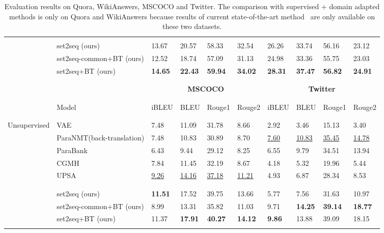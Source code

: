 \begin{table*}[ht]
\begin{tabular}{p{2cm}p{3.4cm}p{0.8cm}<{\centering}p{0.8cm}<{\centering}p{0.8cm}<{\centering}p{0.8cm}<{\centering}p{0.8cm}<{\centering}p{0.8cm}<{\centering}p{0.8cm}<{\centering}p{0.8cm}<{\centering}}
\\ [-1.8ex]
\cline{2-10}
\\ [-1.8ex]
& set2seq \scriptsize{(ours)} & 
13.67 & 20.57 & 58.33 & 32.54 & 26.26 & 33.74 & 56.16 & 23.12 \\
& set2seq-common+BT \scriptsize{(ours)} & 
12.52 & 18.74 & 57.09 & 31.13 & 24.98 & 33.36 & 55.75 & 23.03 \\
& set2seq+BT \scriptsize{(ours)} & 
\textbf{14.65} & \textbf{22.43} & \textbf{59.94} & \textbf{34.02} & \textbf{28.31} & \textbf{37.47} & \textbf{56.82} & \textbf{24.91} \\
\\ [-1.8ex]
\hline
\\ [-1.5ex]
& & \multicolumn{4}{c}{\textbf{MSCOCO}} & \multicolumn{4}{c}{\textbf{Twitter}} \\
\\ [-1.7ex]
\cline{3-6} \cline{7-10} 
\\ [-1.8ex]
 &Model&iBLEU&BLEU&Rouge1&Rouge2&iBLEU&BLEU&Rouge1&Rouge2\\
\\ [-1.8ex]
\hline
\\ [-1.8ex]
\multirow{8}{3cm}{Unsupervised}
& VAE & 
 7.48 & 11.09 & 31.78 &  8.66 &  2.92 &  3.46 & 15.13 &  3.40 \\
& ParaNMT\scriptsize{(back-translation)} & 
 7.48 & 10.83 & 30.89 &  8.70 &  \underline{7.60} & \underline{10.83} & \underline{35.45} & \underline{14.78} \\
& ParaBank & 
 6.43 &  9.44 & 29.12 &  8.25 &  6.55 &  9.79 & 34.51 & 13.94 \\
& CGMH & 
 7.84 & 11.45 & 32.19 &  8.67 &  4.18 &  5.32 & 19.96 &  5.44 \\
& UPSA & 
 \underline{9.26} & \underline{14.16} & \underline{37.18} & \underline{11.21} &  4.93 &  6.87 & 28.34 &  8.53 \\
\\ [-1.8ex]
\cline{2-10}
\\ [-1.8ex]
& set2seq \scriptsize{(ours)} & 
\textbf{11.51} & 17.52 & 39.75 & 13.66 & 5.77 & 7.56 & 31.63 & 10.97 \\
& set2seq-common+BT \scriptsize{(ours)} & 
 8.99 & 13.31 & 35.82 & 11.03 &  9.71 & \textbf{14.25} & \textbf{39.14} & \textbf{18.77} \\
& set2seq+BT \scriptsize{(ours)} & 
11.37 & \textbf{17.91} & \textbf{40.27} & \textbf{14.12} & \textbf{9.86} & 13.88 & 39.09 & 18.15 \\
\\ [-1.8ex]
\hline
\end{tabular}
\caption{\label{tab:result}
Evaluation results on Quora, WikiAnswers, MSCOCO and Twitter. The comparison 
with supervised + domain adapted methods is only on Quora and WikiAnswers 
because results of current state-of-the-art 
method~\citep{li2019decomposable} are only available on these two datasets.
}
\end{table*}

